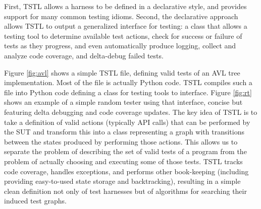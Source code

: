 \documentclass{sig-alternate}
\begin{document}
First, TSTL allows a harness to be defined in a declarative style,
and provides support for many common testing idioms.  Second, the
declarative approach allows TSTL to output a generalized interface for
testing:  a class that allows a testing tool to determine available
test actions, check for success or failure of tests as they progress,
and even automatically produce logging, collect and analyze code
coverage, and delta-debug failed tests.

Figure \ref{fig:avl} shows a simple TSTL file, defining valid tests of
an AVL tree implementation.  Most of the file is actually Python code.
TSTL compiles such a file into Python code defining a class for
testing tools to interface.  Figure \ref{fig:rt} shows an example of a
simple random tester using that interface, concise but featuring delta
debugging \cite{DD} and code coverage updates.  The key idea of TSTL is to
take a definition of valid actions (typically API calls) that can
be performed by the SUT and transform this into a class representing a
graph with transitions between the states produced by performing those
actions.  This allows us to separate the problem of describing the set
of valid tests of a program from the problem of actually choosing and
executing some of those tests.  
TSTL tracks code coverage, handles exceptions, and performs
other book-keeping (including providing easy-to-used state storage and
backtracking), resulting in a simple clean definition not only of
test harnesses but of algorithms for searching their induced test graphs.
\end{document}
